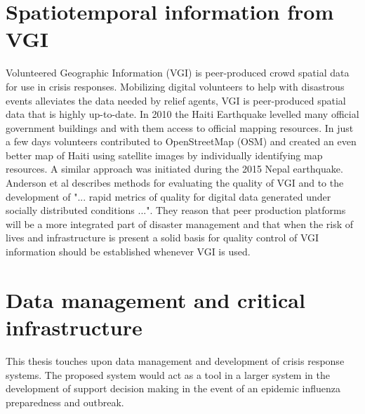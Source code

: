 \section{Spatiotemporal information from VGI}
Volunteered Geographic Information (VGI) is peer-produced crowd spatial data for use in crisis responses. Mobilizing digital volunteers to help with disastrous events alleviates the data needed by relief agents, VGI is peer-produced spatial data that is highly up-to-date. In 2010 the Haiti Earthquake levelled many official government buildings and with them access to official mapping resources\cite{palen2015success}. In just a few days volunteers contributed to OpenStreetMap\cite{OpenStreetMap} (OSM) and created an even better map of Haiti using satellite images by individually identifying map resources. A similar approach was initiated during the 2015 Nepal earthquake\cite{hu2016task}. Anderson et al\cite{anderson2018crowd} describes methods for evaluating the quality of VGI and to the development of "... rapid metrics of quality for digital data generated under socially distributed conditions ...". They reason that peer production platforms will be a more integrated part of disaster management and that when the risk of lives and infrastructure is present a solid basis for quality control of VGI information should be established whenever VGI is used.

\section{Data management and critical infrastructure}
This thesis touches upon data management and development of crisis response systems. The proposed system would act as a tool in a larger system in the development of support decision making in the event of an epidemic influenza preparedness and outbreak. 

